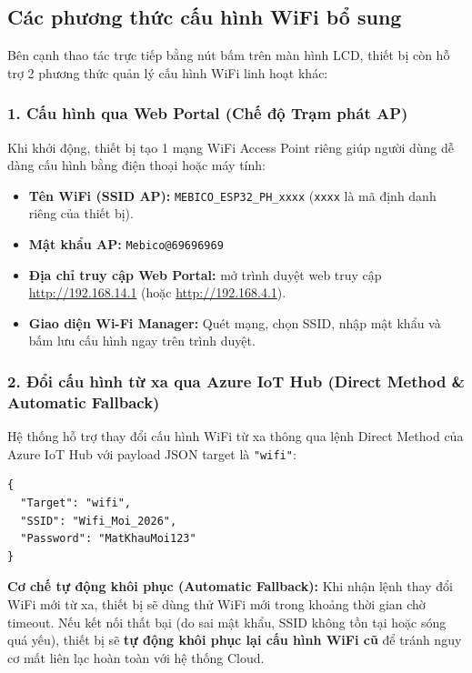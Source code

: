 \documentclass[12pt,a4paper]{article}
\begin{document}
\subsection{Các phương thức cấu hình WiFi bổ sung}

Bên cạnh thao tác trực tiếp bằng nút bấm trên màn hình LCD, thiết bị còn hỗ trợ 2 phương thức quản lý cấu hình WiFi linh hoạt khác:

\subsubsection{1. Cấu hình qua Web Portal (Chế độ Trạm phát AP)}
Khi khởi động, thiết bị tạo 1 mạng WiFi Access Point riêng giúp người dùng dễ dàng cấu hình bằng điện thoại hoặc máy tính:
\begin{itemize}[label={-}]
    \item \textbf{Tên WiFi (SSID AP):} \texttt{MEBICO\_ESP32\_PH\_xxxx} (\texttt{xxxx} là mã định danh riêng của thiết bị).
    \item \textbf{Mật khẩu AP:} \texttt{Mebico@69696969}
    \item \textbf{Địa chỉ truy cập Web Portal:} mở trình duyệt web truy cập \url{http://192.168.14.1} (hoặc \url{http://192.168.4.1}).
    \item \textbf{Giao diện Wi-Fi Manager:} Quét mạng, chọn SSID, nhập mật khẩu và bấm lưu cấu hình ngay trên trình duyệt.
\end{itemize}

\subsubsection{2. Đổi cấu hình từ xa qua Azure IoT Hub (Direct Method \& Automatic Fallback)}
Hệ thống hỗ trợ thay đổi cấu hình WiFi từ xa thông qua lệnh Direct Method của Azure IoT Hub với payload JSON target là \texttt{"wifi"}:

\begin{verbatim}
{
  "Target": "wifi",
  "SSID": "Wifi_Moi_2026",
  "Password": "MatKhauMoi123"
}
\end{verbatim}

\begin{cautionbox}
\textbf{Cơ chế tự động khôi phục (Automatic Fallback):} Khi nhận lệnh thay đổi WiFi mới từ xa, thiết bị sẽ dùng thử WiFi mới trong khoảng thời gian chờ timeout. Nếu kết nối thất bại (do sai mật khẩu, SSID không tồn tại hoặc sóng quá yếu), thiết bị sẽ \textbf{tự động khôi phục lại cấu hình WiFi cũ} để tránh nguy cơ mất liên lạc hoàn toàn với hệ thống Cloud.
\end{cautionbox}
\end{document}
